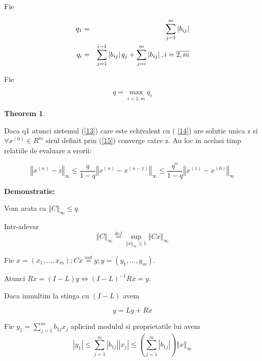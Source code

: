 \documentclass[a4paper,twoside]{book}
\newtheorem{theorem}{Theorem}
\begin{document}
Fie

\begin{eqnarray}
q_{1} &=&\sum_{j=1}^{m}\left\vert b_{ij}\right\vert  \label{15_1} \\
q_{i} &=&\sum_{j=1}^{i-1}\left\vert b_{ij}\right\vert
q_{j}+\sum_{j=i}^{m}\left\vert b_{ij}\right\vert ,i=\overline{2,m}  \notag
\end{eqnarray}

Fie

\begin{equation*}
q=\max_{i=\overline{1,m}}q_{i}
\end{equation*}

\begin{theorem}
\label{GS_2}
\end{theorem}

Daca q\TEXTsymbol{<}1 atunci sistemul (\ref{13}) care este echivalent cu (%
\ref{14}) are solutie unica z si $\forall x^{(0)}\in R^{m}$ sirul definit
prin (\ref{15}) converge catre z. Au loc in acelasi timp relatiile de
evaluare a erorii:

\begin{equation}
\left\Vert x^{(n)}-z\right\Vert _{\infty }\leq \frac{q}{1-q}\left\Vert
x^{(n)}-x^{(n-1)}\right\Vert _{\infty }\leq \frac{q^{n}}{1-q}\left\Vert
x^{(1)}-x^{(0)}\right\Vert _{\infty }  \label{16}
\end{equation}

\textbf{Demonstratie:}

Vom arata ca $\left\Vert C\right\Vert _{\infty }\leq q$.

Intr-adevar 
\begin{equation*}
\left\Vert C\right\Vert _{\infty }\overset{def}{=}\sup_{\left\Vert
x\right\Vert _{\infty }\leq 1}\left\Vert Cx\right\Vert _{\infty }
\end{equation*}

Fie $x=(x_{1},...,x_{m});Cx\overset{not}{=}y;y=(y_{1},...,y_{m})$.

Atunci $Rx=(I-L)y\Leftrightarrow (I-L)^{-1}Rx=y$.

Daca inmultim la stinga cu $(I-L)$ avem

\begin{equation}
y=Ly+Rx  \label{17}
\end{equation}

Fie $y_{1}=\sum_{j=1}^{m}b_{1j}x_{j}$ aplicind modulul si proprietatile lui
avem 
\begin{equation*}
\left\vert y_{1}\right\vert \leq \sum_{j=1}^{m}\left\vert b_{1j}\right\vert
\left\vert x_{j}\right\vert \leq \left( \sum_{j=1}^{m}\left\vert
b_{1j}\right\vert \right) \left\Vert x\right\Vert _{\infty }
\end{equation*}
\end{document}
